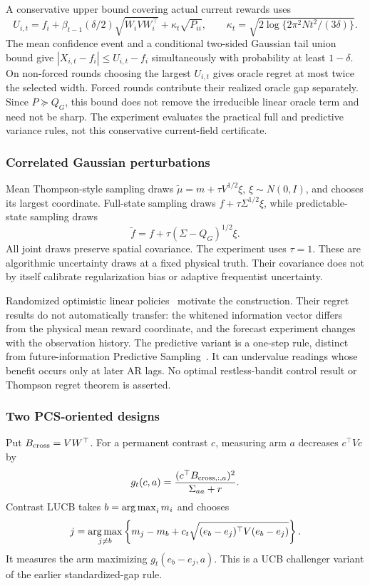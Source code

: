 A conservative upper bound covering actual current rewards uses
\begin{equation}
U_{i,t}=f_i+\beta_{t-1}(\delta/2)\sqrt{W_iVW_i^\top}
+\kappa_t\sqrt{P_{ii}},\qquad
\kappa_t=\sqrt{2\log\{2\pi^2Nt^2/(3\delta)\}}.
\end{equation}
The mean confidence event and a conditional two-sided Gaussian tail union bound give $|X_{i,t}-f_i|\le U_{i,t}-f_i$ simultaneously with probability at least $1-\delta$. On non-forced rounds choosing the largest $U_{i,t}$ gives oracle regret at most twice the selected width. Forced rounds contribute their realized oracle gap separately. Since $P\succeq Q_G$, this bound does not remove the irreducible linear oracle term and need not be sharp. The experiment evaluates the practical full and predictive variance rules, not this conservative current-field certificate.

\subsubsection{Correlated Gaussian perturbations}
Mean Thompson-style sampling draws $\widetilde\mu=m+\tau V^{1/2}\xi$, $\xi\sim N(0,I)$, and chooses its largest coordinate. Full-state sampling draws $f+\tau \Sigma^{1/2}\xi$, while predictable-state sampling draws
\begin{equation}
\widetilde f=f+\tau(\Sigma-Q_G)^{1/2}\xi.
\end{equation}
All joint draws preserve spatial covariance. The experiment uses $\tau=1$. These are algorithmic uncertainty draws at a fixed physical truth. Their covariance does not by itself calibrate regularization bias or adaptive frequentist uncertainty.

Randomized optimistic linear policies~\cite{collected8} motivate the construction. Their regret results do not automatically transfer: the whitened information vector differs from the physical mean reward coordinate, and the forecast experiment changes with the observation history. The predictive variant is a one-step rule, distinct from future-information Predictive Sampling~\cite{collected10}. It can undervalue readings whose benefit occurs only at later AR lags. No optimal restless-bandit control result or Thompson regret theorem is asserted.

\subsubsection{Two PCS-oriented designs}
Put $B_{\rm cross}=VW^\top$. For a permanent contrast $c$, measuring arm $a$ decreases $c^\top Vc$ by
\begin{equation}
g_t(c,a)=\frac{(c^\top B_{{\rm cross},:,a})^2}{\Sigma_{aa}+r}.
\end{equation}
Contrast LUCB takes $b=\operatorname*{arg\,max}_i m_i$ and chooses
\[
j=\operatorname*{arg\,max}_{j\ne b}\left\{m_j-m_b+c_t\sqrt{(e_b-e_j)^\top V(e_b-e_j)}\right\}.
\]
It measures the arm maximizing $g_t(e_b-e_j,a)$. This is a UCB challenger variant of the earlier standardized-gap rule.

